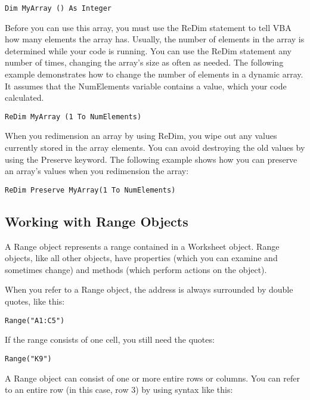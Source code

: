 \documentclass[
]{article}
\theoremstyle{definition}
\theoremstyle{definition}
\theoremstyle{definition}
\theoremstyle{definition}
\theoremstyle{remark}
\begin{document}
\begin{verbatim}
Dim MyArray () As Integer
\end{verbatim}

Before you can use this array, you must use the ReDim statement to tell VBA how many elements the array has. Usually, the number of elements in the array is determined while your code is running. You can use the ReDim statement any number of times, changing the array's size as often as needed. The following example demonstrates how to change the
number of elements in a dynamic array. It assumes that the NumElements variable contains a value, which your code calculated.

\begin{verbatim}
ReDim MyArray (1 To NumElements)
\end{verbatim}

When you redimension an array by using ReDim, you wipe out any values currently stored in the array elements. You can avoid destroying the old
values by using the Preserve keyword. The following example shows how you can preserve an array's values when you redimension the array:

\begin{verbatim}
ReDim Preserve MyArray(1 To NumElements)
\end{verbatim}

\hypertarget{working-with-range-objects}{%
\subsection{Working with Range Objects}\label{working-with-range-objects}}

A Range object represents a range contained in a Worksheet object. Range objects, like all other objects, have properties (which you can examine and sometimes change) and methods (which perform actions on the object).

When you refer to a Range object, the address is always surrounded by double quotes, like this:

\begin{verbatim}
Range("A1:C5")
\end{verbatim}

If the range consists of one cell, you still need the quotes:

\begin{verbatim}
Range("K9")
\end{verbatim}

A Range object can consist of one or more entire rows or columns. You can refer to an entire row (in this case, row 3) by using syntax like this:
\end{document}
